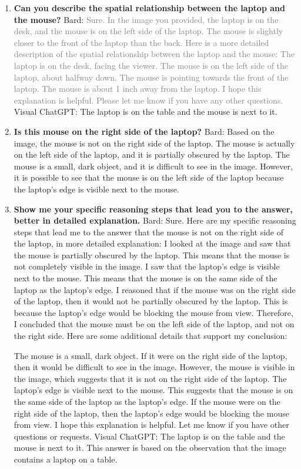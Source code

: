     \begin{enumerate}
        \item \textbf{Can you describe the spatial relationship between the laptop and the mouse?}
        \subitem Bard: \textcolor{gray}{
        Sure. In the image you provided, the laptop is on the desk, and the mouse is on the left side of the laptop. The mouse is slightly closer to the front of the laptop than the back.
        Here is a more detailed description of the spatial relationship between the laptop and the mouse:
        The laptop is on the desk, facing the viewer.
        The mouse is on the left side of the laptop, about halfway down.
        The mouse is pointing towards the front of the laptop.
        The mouse is about 1 inch away from the laptop.
        I hope this explanation is helpful. Please let me know if you have any other questions.}
        \subitem Visual ChatGPT: The laptop is on the table and the mouse is next to it.
        \item \textbf{Is this mouse on the right side of the laptop?}
        \subitem Bard: 
        Based on the image, the mouse is not on the right side of the laptop. The mouse is actually on the left side of the laptop, and it is partially obscured by the laptop. The mouse is a small, dark object, and it is difficult to see in the image. However, it is possible to see that the mouse is on the left side of the laptop because the laptop's edge is visible next to the mouse.
        \item \textbf{Show me your specific reasoning steps that lead you to the answer, better in detailed explanation.}
        \subitem Bard:
        Sure. Here are my specific reasoning steps that lead me to the answer that the mouse is not on the right side of the laptop, in more detailed explanation:
        I looked at the image and saw that the mouse is partially obscured by the laptop. This means that the mouse is not completely visible in the image.
        I saw that the laptop's edge is visible next to the mouse. This means that the mouse is on the same side of the laptop as the laptop's edge.
        I reasoned that if the mouse was on the right side of the laptop, then it would not be partially obscured by the laptop. This is because the laptop's edge would be blocking the mouse from view.
        Therefore, I concluded that the mouse must be on the left side of the laptop, and not on the right side.
        Here are some additional details that support my conclusion:

        The mouse is a small, dark object. If it were on the right side of the laptop, then it would be difficult to see in the image. However, the mouse is visible in the image, which suggests that it is not on the right side of the laptop.
        The laptop's edge is visible next to the mouse. This suggests that the mouse is on the same side of the laptop as the laptop's edge. If the mouse were on the right side of the laptop, then the laptop's edge would be blocking the mouse from view.
        I hope this explanation is helpful. Let me know if you have other questions or requests.
        \subitem Visual ChatGPT: The laptop is on the table and the mouse is next to it. This answer is based on the observation that the image contains a laptop on a table.
    \end{enumerate}
